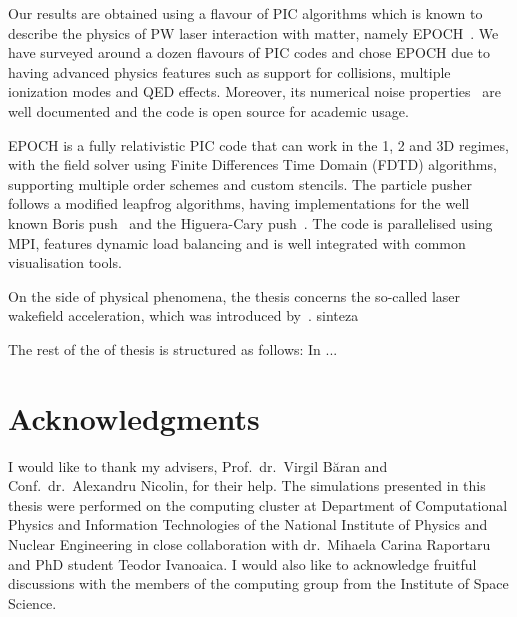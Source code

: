 \documentclass[12pt, class=report, crop=false]{standalone}
\begin{document}
Our results are obtained using a flavour of PIC algorithms which is known
to describe the physics of PW laser interaction with matter, namely
EPOCH~\autocite{arber_contemporaryparticleincell_2015}. We have surveyed around
a dozen flavours of PIC codes and chose EPOCH due to having advanced physics
features such as support for collisions, multiple ionization modes and QED
effects. Moreover, its numerical noise properties~\autocite{arber_contemporaryparticleincell_2015}
are well documented and the code is open source for academic usage.

EPOCH is a fully relativistic PIC code that can work in the 1, 2 and 3D regimes,
with the field solver using Finite Differences Time Domain (FDTD) algorithms,
supporting multiple order schemes and custom stencils. The particle pusher follows
a modified leapfrog algorithms, having implementations for the well known
Boris push~\autocite{boris_relativisticplasma_1970} and the Higuera-Cary
push~\autocite{higuera_structurepreservingsecondorder_2017}. The code is parallelised
using MPI, features dynamic load balancing and is well integrated with common
visualisation tools.

On the side of physical phenomena, the thesis concerns the so-called laser wakefield
acceleration, which was introduced by~\textcite{tajima_laserelectron_1979}.
sinteza

The rest of the of thesis is structured as follows: In ...

\section*{Acknowledgments}
I would like to thank my advisers, Prof.~dr.~Virgil Băran and Conf.~dr.~Alexandru Nicolin,
for their help. The simulations presented in this thesis were performed on the
computing cluster at Department of Computational Physics and Information
Technologies of the National Institute of Physics and Nuclear Engineering
in close collaboration with dr.~Mihaela Carina Raportaru and PhD student
Teodor Ivanoaica. I would also like to acknowledge fruitful discussions with
the members of the computing group from the Institute of Space Science.
\end{document}
